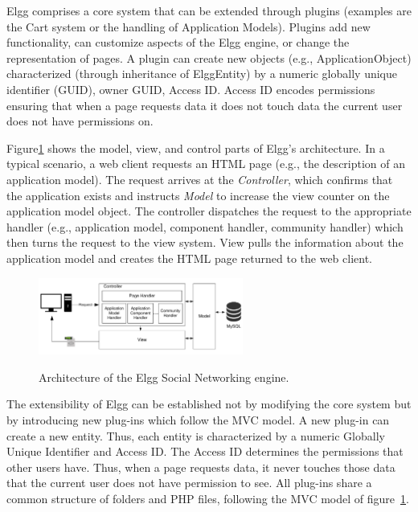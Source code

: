 Elgg comprises a core system that can be extended through plugins (examples are the Cart system or the handling of Application Models). Plugins add new functionality, can customize aspects of the Elgg engine, or change the representation of pages.
A plugin can create new objects (e.g., ApplicationObject) characterized (through inheritance of ElggEntity) by a numeric globally unique identifier (GUID), owner GUID, Access ID. Access ID encodes permissions ensuring that when a page requests data it does not touch data the current user does not have permissions on. 

Figure\ref{fig:elgg_architecture} shows the model, view, and control parts of Elgg's architecture. In a typical scenario, a web client requests an HTML page (e.g., the description of an application model).  The request arrives at the \emph{Controller}, which confirms that the application exists and instructs \emph{Model} to increase the view counter on the application model object. The controller dispatches the request to the appropriate handler (e.g., application model, component handler, community handler) which then turns the request to the view system. View pulls the information about the application model and creates the HTML page returned to the web client.

\begin{figure}[h]
	\caption{Architecture of the Elgg Social Networking engine.}
	\includegraphics[width=0.6\textwidth,natwidth=200,natheight=150]{./fig/elgg_architecture.pdf}
	\centering
	\label{fig:elgg_architecture}
\end{figure}


The extensibility of Elgg can be established not by modifying the core system but by introducing new plug-ins which follow the MVC model. A new plug-in can create a new entity. Thus, each entity is characterized by a numeric Globally Unique Identifier and Access ID. The Access ID determines the permissions that other users have. Thus, when a page requests data, it never touches those data that the current user does not have permission to see. All plug-ins share a common structure of folders and PHP files, following the MVC model of figure~\ref{fig:elgg_architecture}. 

